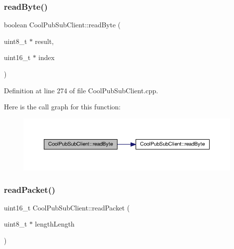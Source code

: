 \subsubsection{\texorpdfstring{read\+Byte()}{readByte()}\hspace{0.1cm}{\footnotesize\ttfamily [2/2]}}
{\footnotesize\ttfamily boolean Cool\+Pub\+Sub\+Client\+::read\+Byte (\begin{DoxyParamCaption}\item[{uint8\+\_\+t $\ast$}]{result,  }\item[{uint16\+\_\+t $\ast$}]{index }\end{DoxyParamCaption})\hspace{0.3cm}{\ttfamily [private]}}



Definition at line 274 of file Cool\+Pub\+Sub\+Client.\+cpp.

Here is the call graph for this function\+:
\nopagebreak
\begin{figure}[H]
\begin{center}
\leavevmode
\includegraphics[width=350pt]{class_cool_pub_sub_client_abef3735bb9a2a8c87b3da659dc4ade03_cgraph}
\end{center}
\end{figure}
\mbox{\label{class_cool_pub_sub_client_a25a8779149cfa809b7c06f63568b25cf}} 
\subsubsection{\texorpdfstring{read\+Packet()}{readPacket()}}
{\footnotesize\ttfamily uint16\+\_\+t Cool\+Pub\+Sub\+Client\+::read\+Packet (\begin{DoxyParamCaption}\item[{uint8\+\_\+t $\ast$}]{length\+Length }\end{DoxyParamCaption})\hspace{0.3cm}{\ttfamily [private]}}



